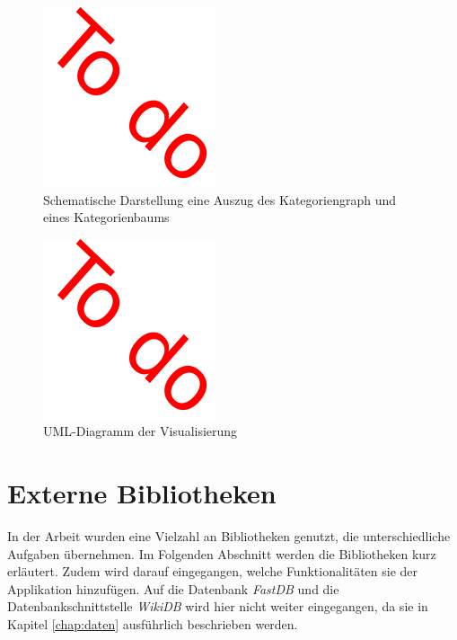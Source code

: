 

\begin{figure}
    \centering
    \includegraphics{images/todobild.pdf}
    \caption{Schematische Darstellung eine Auszug des Kategoriengraph und eines Kategorienbaums}
    \label{fig:abstract-tree}
\end{figure}

\begin{figure}
    \centering
    \includegraphics{images/todobild.pdf}
    \caption{UML-Diagramm der Visualisierung}
    \label{fig:uml-app}
\end{figure}


\section{Externe Bibliotheken}\label{subchap:external-libs}

In der Arbeit wurden eine Vielzahl an Bibliotheken genutzt, die unterschiedliche Aufgaben übernehmen. Im Folgenden Abschnitt werden die Bibliotheken kurz erläutert. Zudem wird darauf eingegangen, welche Funktionalitäten sie der Applikation hinzufügen.
Auf die Datenbank \emph{FastDB} und die Datenbankschnittstelle \emph{WikiDB} wird hier nicht weiter eingegangen, da sie in Kapitel \ref{chap:daten} ausführlich beschrieben werden.

